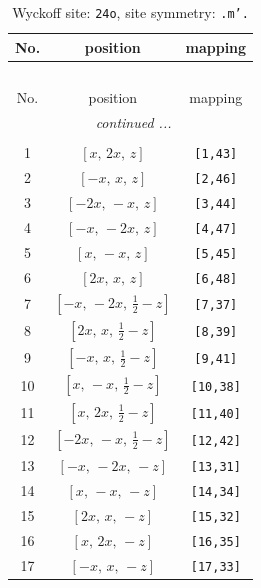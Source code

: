\documentclass[fleqn,8pt]{jsarticle}
\begin{document}
\begin{longtable}{ccc}
\caption{Wyckoff site: {\tt 24o}, site symmetry: {\tt .m'.}}
 \\
 \hline \hline
No. & position & mapping \\ \hline \endfirsthead

\multicolumn{2}{l}{\tablename\ \thetable{}} \\
 \hline \hline
No. & position & mapping \\ \hline \endhead

 \hline \hline
\multicolumn{2}{r}{\footnotesize\it continued ...} \\ \endfoot

 \hline \hline
\multicolumn{2}{r}{} \\ \endlastfoot

1 & $\left[ x,\, 2 x,\, z \right]$ & {\tt [1,43]} \\ \hline
2 & $\left[ - x,\, x,\, z \right]$ & {\tt [2,46]} \\ \hline
3 & $\left[ - 2 x,\, - x,\, z \right]$ & {\tt [3,44]} \\ \hline
4 & $\left[ - x,\, - 2 x,\, z \right]$ & {\tt [4,47]} \\ \hline
5 & $\left[ x,\, - x,\, z \right]$ & {\tt [5,45]} \\ \hline
6 & $\left[ 2 x,\, x,\, z \right]$ & {\tt [6,48]} \\ \hline
7 & $\left[ - x,\, - 2 x,\, \frac{1}{2} - z \right]$ & {\tt [7,37]} \\ \hline
8 & $\left[ 2 x,\, x,\, \frac{1}{2} - z \right]$ & {\tt [8,39]} \\ \hline
9 & $\left[ - x,\, x,\, \frac{1}{2} - z \right]$ & {\tt [9,41]} \\ \hline
10 & $\left[ x,\, - x,\, \frac{1}{2} - z \right]$ & {\tt [10,38]} \\ \hline
11 & $\left[ x,\, 2 x,\, \frac{1}{2} - z \right]$ & {\tt [11,40]} \\ \hline
12 & $\left[ - 2 x,\, - x,\, \frac{1}{2} - z \right]$ & {\tt [12,42]} \\ \hline
13 & $\left[ - x,\, - 2 x,\, - z \right]$ & {\tt [13,31]} \\ \hline
14 & $\left[ x,\, - x,\, - z \right]$ & {\tt [14,34]} \\ \hline
15 & $\left[ 2 x,\, x,\, - z \right]$ & {\tt [15,32]} \\ \hline
16 & $\left[ x,\, 2 x,\, - z \right]$ & {\tt [16,35]} \\ \hline
17 & $\left[ - x,\, x,\, - z \right]$ & {\tt [17,33]} \\ \hline

\end{longtable}
\end{document}
